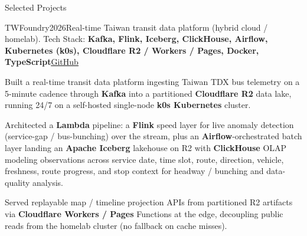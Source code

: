 \documentclass[
	11pt, %
]{resume} %
\begin{document}

\begin{rSection}{Selected Projects}
\begin{rSubsection}{TWFoundry}{2026}{Real-time Taiwan transit data platform (hybrid cloud / homelab). Tech Stack: {\color{teal}\textbf{Kafka, Flink, Iceberg, ClickHouse, Airflow, Kubernetes (k0s), Cloudflare R2 / Workers / Pages, Docker, TypeScript}}}{{\color{teal}\underline{\href{https://github.com/unknowntpo/twfoundry}{GitHub}}}}
		\item Built a real-time transit data platform ingesting Taiwan TDX bus telemetry on a 5-minute cadence through \textbf{Kafka} into a partitioned \textbf{Cloudflare R2} data lake, running 24/7 on a self-hosted single-node \textbf{k0s Kubernetes} cluster.
		\item Architected a \textbf{Lambda} pipeline: a \textbf{Flink} speed layer for live anomaly detection (service-gap / bus-bunching) over the stream, plus an \textbf{Airflow}-orchestrated batch layer landing an \textbf{Apache Iceberg} lakehouse on R2 with \textbf{ClickHouse} OLAP modeling observations across service date, time slot, route, direction, vehicle, freshness, route progress, and stop context for headway / bunching and data-quality analysis.
		\item Served replayable map / timeline projection APIs from partitioned R2 artifacts via \textbf{Cloudflare Workers / Pages} Functions at the edge, decoupling public reads from the homelab cluster (no fallback on cache misses).
	\end{rSubsection}
\end{rSection}

\end{document}
